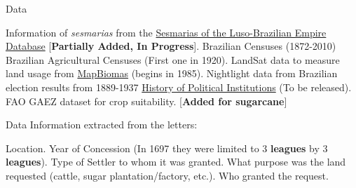 \documentclass[aspectratio=1610, handout]{beamer}
\begin{document}
\begin{frame}{Data}
    \begin{outline}
        \1 Information of \textit{sesmarias} from the \href{http://plataformasilb.cchla.ufrn.br/}{Sesmarias of the Luso-Brazilian Empire Database} [\textbf{Partially Added, In Progress}].
        \vspace{2mm}
        \1 Brazilian Censuses (1872-2010)
        \vspace{2mm}
        \1 Brazilian Agricultural Censuses (First one in 1920).
        \vspace{2mm}
        \1 LandSat data to measure land usage from \href{https://brasil.mapbiomas.org/en/}{MapBiomas} (begins in 1985).
        \vspace{2mm}
        \1 Nightlight data from \textcite{Li2020-cc}
        \vspace{2mm}
        \1 Brazilian election results from 1889-1937 \href{https://projetohipol.wordpress.com/projetos/eleicoes-antes-da-democracia-dados-estatisticos-1889-1937/}{History of Political Institutions} (To be released).
        \vspace{2mm}
        \1 FAO GAEZ dataset for crop suitability. [\textbf{Added for sugarcane}]
    \end{outline}
\end{frame}



\begin{frame}{Data}
    Information extracted from the letters:
    \begin{outline}
        \vspace{2mm}
        \1 Location.
        \vspace{2mm}
        \1 Year of Concession (In 1697 they were limited to 3 \textbf{leagues} by 3 \textbf{leagues}).
        \vspace{2mm}
        \1 Type of Settler to whom it was granted.
        \vspace{2mm}
        \1 What purpose was the land requested (cattle, sugar plantation/factory, etc.).
        \vspace{2mm}
        \1 Who granted the request.
    \end{outline}
\end{frame}
\end{document}
